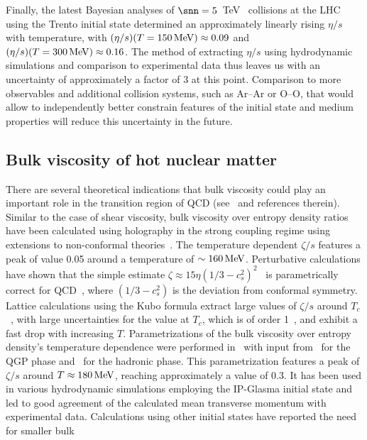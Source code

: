 Finally, the latest Bayesian analyses of $\snn=5$~TeV \pbpb\ 
  collisions at the LHC using the Trento initial state determined an 
  approximately linearly rising $\eta/s$ with temperature, with 
  $(\eta/s)(T=150\,{\rm MeV})\approx 0.09$ and 
  $(\eta/s)(T=300\,{\rm MeV})\approx 0.16$.
The method of extracting $\eta/s$ using hydrodynamic simulations and comparison 
  to experimental data thus leaves us with an uncertainty of approximately 
  a factor of $3$ at this point. 
Comparison to more observables and additional collision systems, 
  such as Ar--Ar or O--O, that would allow to independently better constrain 
  features of the initial state and medium properties will reduce this 
  uncertainty in the future. 


\subsection{Bulk viscosity of hot nuclear matter}
There are several theoretical indications that bulk viscosity could play 
  an important role in the transition region of QCD (see~\cite{Ryu:2017qzn} 
  and references therein). 
Similar to the case of shear viscosity, bulk viscosity over entropy density 
  ratios have been calculated using holography in the strong coupling regime 
  using extensions to non-conformal theories~\cite{Buchel:2007mf,Finazzo:2014cna}. 
The temperature dependent $\zeta/s$ features a peak of value 0.05 around a 
  temperature of $\sim 160\,{\rm MeV}$. 
Perturbative calculations have shown that the simple estimate 
  $\zeta\approx 15 \eta(1/3-c_s^2)^2$~\cite{Horsley:1985dz} is parametrically 
  correct for QCD~\cite{Arnold:2006fz}, where $(1/3-c_s^2)$ is the deviation 
  from conformal symmetry. 
Lattice calculations using the Kubo formula extract large values of $\zeta/s$ 
  around $T_c$~\cite{Karsch:2007jc,Meyer:2007dy}, with large uncertainties for 
  the value at $T_c$, which is of order 1~\cite{Kharzeev:2007wb}, and exhibit 
  a fast drop with increasing $T$.
Parametrizations of the bulk viscosity over entropy density's temperature 
  dependence were performed in~\cite{Denicol:2009am} with input from~\cite{Karsch:2007jc} 
  for the QGP phase and~\cite{NoronhaHostler:2008ju} for the hadronic phase. 
This parametrization features a peak of $\zeta/s$ around $T\approx 180\,{\rm MeV}$, 
  reaching approximately a value of 0.3. 
It has been used in various hydrodynamic simulations employing the IP-Glasma 
  initial state and led to good agreement of the calculated mean transverse 
  momentum with experimental data. 
Calculations using other initial states have reported the need for smaller bulk 
